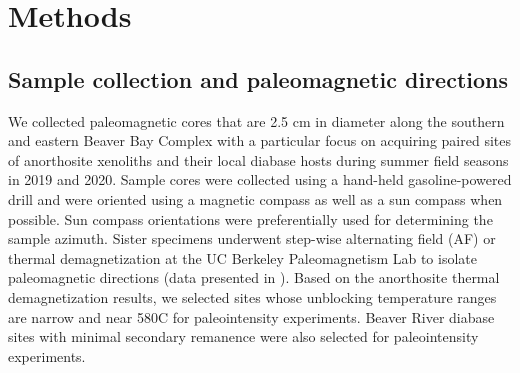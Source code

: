 \section{Methods}
\subsection*{Sample collection and paleomagnetic directions}

We collected paleomagnetic cores that are 2.5 cm in diameter along the southern and eastern Beaver Bay Complex with a particular focus on acquiring paired sites of anorthosite xenoliths and their local diabase hosts during summer field seasons in 2019 and 2020. Sample cores were collected using a hand-held gasoline-powered drill and were oriented using a magnetic compass as well as a sun compass when possible. Sun compass orientations were preferentially used for determining the sample azimuth. Sister specimens underwent step-wise alternating field (AF) or thermal demagnetization at the UC Berkeley Paleomagnetism Lab to isolate paleomagnetic directions (data presented in \citealp{Zhang2021b}). Based on the anorthosite thermal demagnetization results, we selected sites whose unblocking temperature ranges are narrow and near 580\textdegree C for paleointensity experiments. Beaver River diabase sites with minimal secondary remanence were also selected for paleointensity experiments. 

